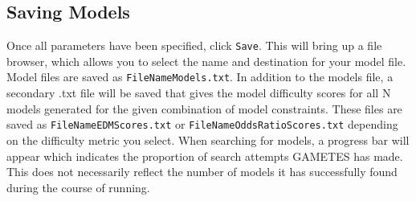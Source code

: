 \documentclass{report}
\begin{document}
\subsection{Saving Models}\label{saving}
Once all parameters have been specified, click \texttt{Save}.  This will bring up a file browser, which allows you to select the name and destination for your model file.  Model files are saved as \texttt{FileName\textunderscore Models.txt}. In addition to the models file, a secondary .txt file will be saved that gives the model difficulty scores for all N models generated for the given combination of model constraints.  These files are saved as \texttt{FileName\textunderscore EDM\textunderscore Scores.txt} or \texttt{FileName\textunderscore OddsRatio\textunderscore Scores.txt} depending on the difficulty metric you select.  When searching for models, a progress bar will appear which indicates the proportion of search attempts GAMETES has made.  This does not necessarily reflect the number of models it has successfully found during the course of running.
\end{document}
